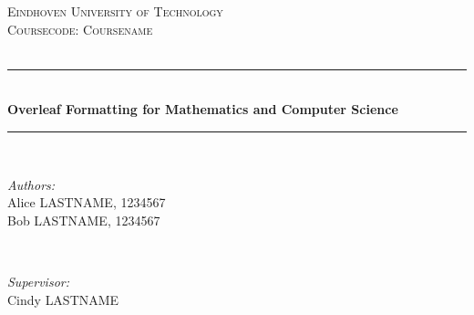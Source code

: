 \begin{titlepage}

\newcommand{\HRule}{\rule{\linewidth}{0.5mm}} %

\center %
 

\textsc{\LARGE Eindhoven University of Technology}\\[1.5cm] %
\textsc{\Large Coursecode: Coursename}\\[0.5cm] %
\textsc{\large }\\[0.5cm] %


\HRule \\[0.4cm]
{ \huge \bfseries Overleaf Formatting for Mathematics and Computer Science}\\[0.4cm] %
\HRule \\[1.5cm]
 

\begin{minipage}{0.4\textwidth}
\begin{flushleft} \large
\emph{Authors:}\\
Alice \textsc{LASTNAME}, 1234567\\
Bob \textsc{LASTNAME}, 1234567
\end{flushleft}
\end{minipage}
~
\begin{minipage}{0.4\textwidth}
\begin{flushright} \large
\emph{Supervisor:} \\
Cindy \textsc{LASTNAME} %
\end{flushright}
\end{minipage}\\[2cm]


\end{titlepage}
